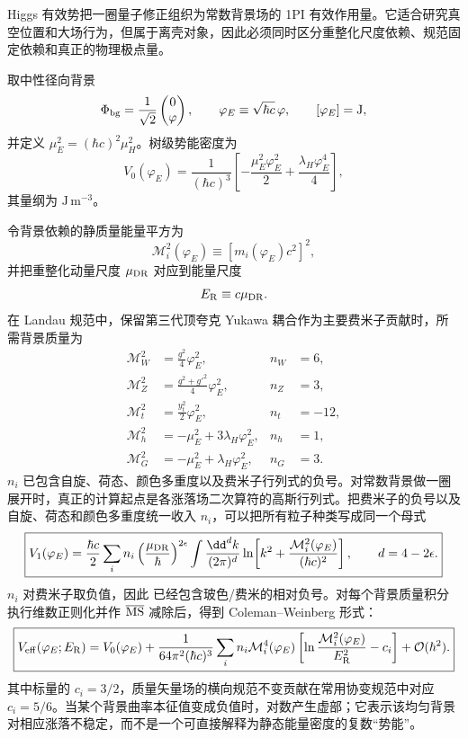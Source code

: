Higgs 有效势把一圈量子修正组织为常数背景场的 1PI 有效作用量。它适合研究真空位置和大场行为，但属于离壳对象，因此必须同时区分重整化尺度依赖、规范固定依赖和真正的物理极点量。

取中性径向背景
\begin{equation*}
\Phi_{\rm bg}
=\frac1{\sqrt2}\begin{pmatrix}0\\\varphi\end{pmatrix},
\qquad
\varphi_E\equiv\sqrt{\hbar c}\,\varphi,
\qquad [\varphi_E]=\mathrm J,
\end{equation*}
并定义 $\mu_E^2=(\hbar c)^2\mu_H^2$。树级势能密度为
\begin{equation*}
V_0(\varphi_E)
=\frac1{(\hbar c)^3}
\left[-\frac{\mu_E^2\varphi_E^2}{2}
+\frac{\lambda_H\varphi_E^4}{4}\right],
\end{equation*}
其量纲为 $\mathrm{J\,m^{-3}}$。

令背景依赖的静质量能量平方为
\begin{equation*}
\mathcal M_i^2(\varphi_E)\equiv[m_i(\varphi_E)c^2]^2,
\end{equation*}
并把重整化动量尺度 $\mu_{\rm DR}$ 对应到能量尺度
\begin{equation*}
E_{\rm R}\equiv c\mu_{\rm DR}.
\end{equation*}
在 Landau 规范中，保留第三代顶夸克 Yukawa 耦合作为主要费米子贡献时，所需背景质量为
\begin{align*}
\mathcal M_W^2&=\frac{g^2}{4}\varphi_E^2,&n_W&=6,\\
\mathcal M_Z^2&=\frac{g^2+g'^2}{4}\varphi_E^2,&n_Z&=3,\\
\mathcal M_t^2&=\frac{y_t^2}{2}\varphi_E^2,&n_t&=-12,\\
\mathcal M_h^2&=-\mu_E^2+3\lambda_H\varphi_E^2,&n_h&=1,\\
\mathcal M_G^2&=-\mu_E^2+\lambda_H\varphi_E^2,&n_G&=3.
\end{align*}
$n_i$ 已包含自旋、荷态、颜色多重度以及费米子行列式的负号。对常数背景做一圈展开时，真正的计算起点是各涨落场二次算符的高斯行列式。把费米子的负号以及自旋、荷态和颜色多重度统一收入 $n_i$，可以把所有粒子种类写成同一个母式
\begin{equation}
\boxed{
V_1(\varphi_E)
=\frac{\hbar c}{2}\sum_i n_i
\left(\frac{\mu_{\rm DR}}{\hbar}\right)^{2\epsilon}
\int\frac{\dd^d k}{(2\pi)^d}
\ln\!\left[k^2+\frac{\mathcal M_i^2(\varphi_E)}{(\hbar c)^2}\right],
\qquad d=4-2\epsilon .}
\label{eq:sm-one-loop-determinant-master-dp68}
\end{equation}
$n_i$ 对费米子取负值，因此 已经包含玻色/费米的相对负号。对每个背景质量积分执行维数正则化并作 $\overline{\rm MS}$ 减除后，得到 Coleman--Weinberg 形式：
\begin{equation}
\boxed{
V_{\rm eff}(\varphi_E;E_{\rm R})
=V_0(\varphi_E)
+\frac1{64\pi^2(\hbar c)^3}
\sum_i n_i\mathcal M_i^4(\varphi_E)
\left[\ln\frac{\mathcal M_i^2(\varphi_E)}{E_{\rm R}^2}-c_i\right]
+\mathcal O(\hbar^2).}
\label{eq:sm-coleman-weinberg-si-dp12}
\end{equation}
其中标量的 $c_i=3/2$，质量矢量场的横向规范不变贡献在常用协变规范中对应 $c_i=5/6$。当某个背景曲率本征值变成负值时，对数产生虚部；它表示该均匀背景对相应涨落不稳定，而不是一个可直接解释为静态能量密度的复数“势能”。

